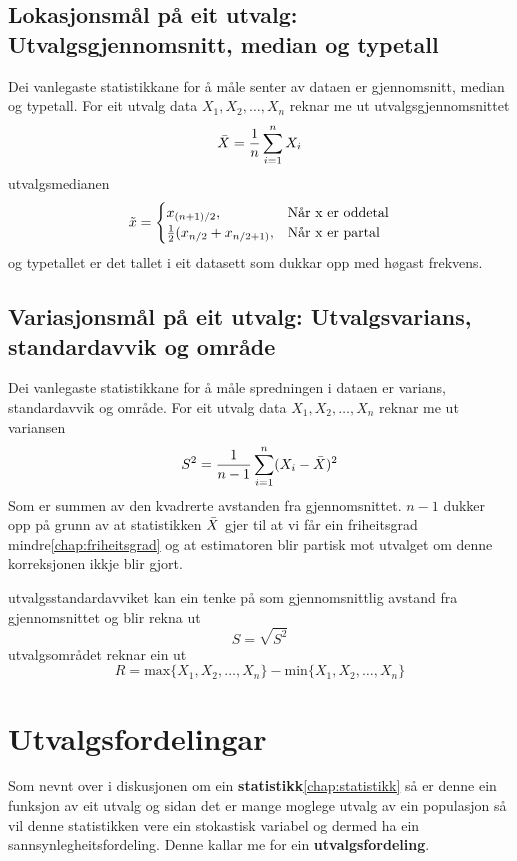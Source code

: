 \subsection{Lokasjonsmål på eit utvalg: Utvalgsgjennomsnitt, median og typetall}

Dei vanlegaste statistikkane for å måle senter av dataen er gjennomsnitt, median og typetall. For eit utvalg data $X_1, X_2, \dots, X_n$ reknar me ut utvalgsgjennomsnittet
\begin{equation}
    \Bar{X} = \frac{1}{n}\sum_{i=1}^n X_i
\end{equation}
utvalgsmedianen
\begin{equation}
    \Tilde{x} = 
    \begin{cases}
    x_{(n+1) / 2}, & \text{Når x er oddetal}  \\
    \frac{1}{2} (x_{n/2} + x_{n/2 + 1)}, & \text{Når x er partal}
    \end{cases}
\end{equation}
og typetallet er det tallet i eit datasett som dukkar opp med høgast frekvens.

\subsection{Variasjonsmål på eit utvalg: Utvalgsvarians, standardavvik og område}
Dei vanlegaste statistikkane for å måle spredningen i dataen er varians, standardavvik og område. For eit utvalg data $X_1, X_2, \dots, X_n$ reknar me ut variansen
\begin{equation}
    S^2 = \frac{1}{n - 1} \sum_{i = 1}^n (X_i - \Bar{X})^2
\end{equation}
Som er summen av den kvadrerte avstanden fra gjennomsnittet. $n - 1$ dukker opp på grunn av at statistikken $\Bar{X}$ gjer til at vi får ein friheitsgrad mindre\ref{chap:friheitsgrad} og at estimatoren blir partisk mot utvalget om denne korreksjonen ikkje blir gjort. 

utvalgsstandardavviket kan ein tenke på som gjennomsnittlig avstand fra gjennomsnittet og blir rekna ut 
\begin{equation}
    S = \sqrt{S^2}
\end{equation}
utvalgsområdet reknar ein ut 
\begin{equation}
    R = \text{max}\{X_1, X_2, \dots, X_n\} - \text{min}\{X_1, X_2, \dots, X_n\}
\end{equation}

\section{Utvalgsfordelingar}
Som nevnt over i diskusjonen om ein \textbf{statistikk}\ref{chap:statistikk} så er denne ein funksjon av eit utvalg og sidan det er mange moglege utvalg av ein populasjon så vil denne statistikken vere ein stokastisk variabel og dermed ha ein sannsynlegheitsfordeling. Denne kallar me for ein \textbf{utvalgsfordeling}.

